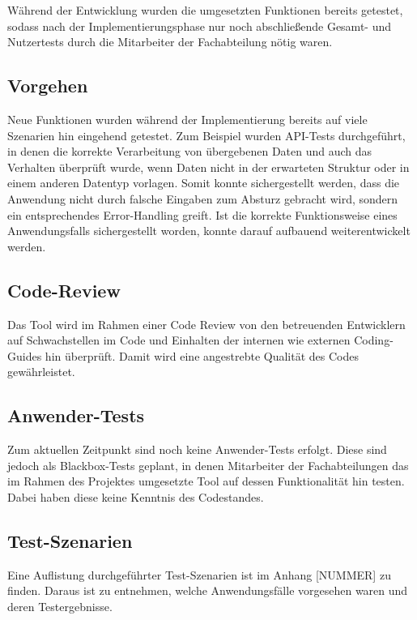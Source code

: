 Während der Entwicklung wurden die umgesetzten Funktionen bereits getestet, sodass nach der Implementierungsphase nur noch abschließende Gesamt- und Nutzertests durch die Mitarbeiter der Fachabteilung nötig waren.

\subsection{Vorgehen}
    Neue Funktionen wurden während der Implementierung bereits auf viele Szenarien hin eingehend getestet. Zum Beispiel wurden API-Tests durchgeführt, in denen die korrekte Verarbeitung von übergebenen Daten und auch das Verhalten überprüft wurde, wenn Daten nicht in der erwarteten Struktur oder in einem anderen Datentyp vorlagen. Somit konnte sichergestellt werden, dass die Anwendung nicht durch falsche Eingaben zum Absturz gebracht wird, sondern ein entsprechendes Error-Handling greift. Ist die korrekte Funktionsweise eines Anwendungsfalls sichergestellt worden, konnte darauf aufbauend weiterentwickelt werden.

\subsection{Code-Review}
    Das Tool wird im Rahmen einer Code Review von den betreuenden Entwicklern auf Schwachstellen im Code und Einhalten der internen wie externen Coding-Guides hin überprüft. Damit wird eine angestrebte Qualität des Codes gewährleistet.

\subsection{Anwender-Tests}
    Zum aktuellen Zeitpunkt sind noch keine Anwender-Tests erfolgt. Diese sind jedoch als Blackbox-Tests geplant, in denen Mitarbeiter der Fachabteilungen das im Rahmen des Projektes umgesetzte Tool auf dessen Funktionalität hin testen. Dabei haben diese keine Kenntnis des Codestandes.

\subsection{Test-Szenarien}
    Eine Auflistung durchgeführter Test-Szenarien ist im Anhang [NUMMER] zu finden. Daraus ist zu entnehmen, welche Anwendungsfälle vorgesehen waren und deren Testergebnisse.